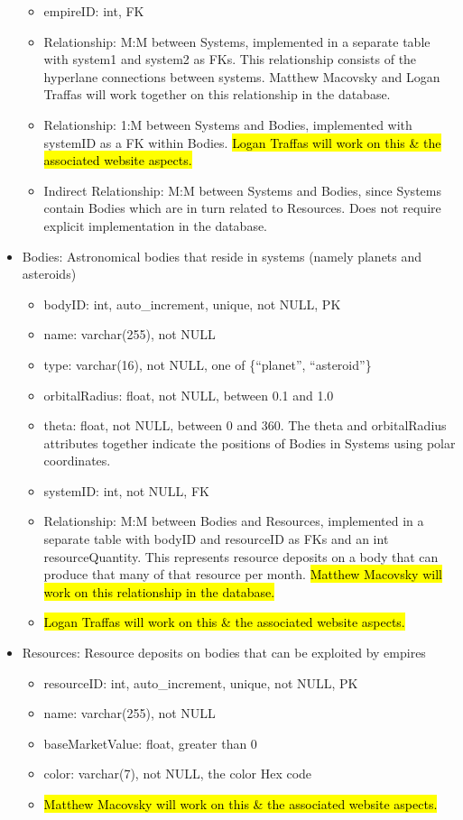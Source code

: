 \documentclass[12pt]{article}
\begin{document}
\begin{itemize}
\begin{itemize}
        \item empireID: int, FK
        \item Relationship: M:M between Systems, implemented in a separate table with system1 and system2 as FKs. This relationship consists of the hyperlane connections between systems. Matthew Macovsky and Logan Traffas will work together on this relationship in the database. 
        \item Relationship: 1:M between Systems and Bodies, implemented with systemID as a FK within Bodies. \hl{Logan Traffas will work on this \& the associated website aspects.}
        \item Indirect Relationship: M:M between Systems and Bodies, since Systems contain Bodies which are in turn related to Resources. Does not require explicit implementation in the database.
    \end{itemize}
    \item Bodies: Astronomical bodies that reside in systems (namely planets and asteroids)
    \begin{itemize}
        \item bodyID: int, auto\_increment, unique, not NULL, PK
        \item name: varchar(255), not NULL
        \item type: varchar(16), not NULL, one of \{“planet”, “asteroid”\}
        \item orbitalRadius: float, not NULL, between 0.1 and 1.0
        \item theta: float, not NULL, between 0 and 360. The theta and orbitalRadius attributes together indicate the positions of Bodies in Systems using polar coordinates.
        \item systemID: int, not NULL, FK
        \item Relationship: M:M between Bodies and Resources, implemented in a separate table with bodyID and resourceID as FKs and an int resourceQuantity. This represents resource deposits on a body that can produce that many of that resource per month. \hl{Matthew Macovsky will work on this relationship in the database.}
        \item \hl{Logan Traffas will work on this \& the associated website aspects.}
    \end{itemize}
    \item Resources: Resource deposits on bodies that can be exploited by empires
    \begin{itemize}
        \item resourceID: int, auto\_increment, unique, not NULL, PK
        \item name: varchar(255), not NULL
        \item baseMarketValue: float, greater than 0
        \item color: varchar(7), not NULL, the color Hex code
        \item \hl{Matthew Macovsky will work on this \& the associated website aspects.}
    \end{itemize}
\end{itemize}
\end{document}
